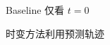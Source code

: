 \begin{subfigure}[b]{0.48\textwidth}
  \centering
  \caption{Baseline 仅看 $t{=}0$}
\end{subfigure}\hfill
\begin{subfigure}[b]{0.48\textwidth}
  \centering
  \caption{时变方法利用预测轨迹}
\end{subfigure}
